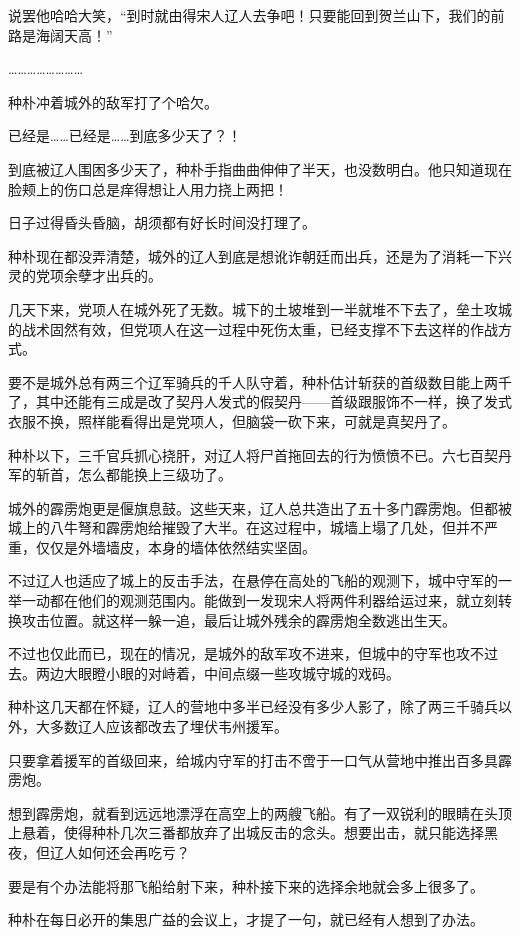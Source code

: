 说罢他哈哈大笑，“到时就由得宋人辽人去争吧！只要能回到贺兰山下，我们的前路是海阔天高！”

……………………

种朴冲着城外的敌军打了个哈欠。

已经是……已经是……到底多少天了？！

到底被辽人围困多少天了，种朴手指曲曲伸伸了半天，也没数明白。他只知道现在脸颊上的伤口总是痒得想让人用力挠上两把！

日子过得昏头昏脑，胡须都有好长时间没打理了。

种朴现在都没弄清楚，城外的辽人到底是想讹诈朝廷而出兵，还是为了消耗一下兴灵的党项余孽才出兵的。

几天下来，党项人在城外死了无数。城下的土坡堆到一半就堆不下去了，垒土攻城的战术固然有效，但党项人在这一过程中死伤太重，已经支撑不下去这样的作战方式。

要不是城外总有两三个辽军骑兵的千人队守着，种朴估计斩获的首级数目能上两千了，其中还能有三成是改了契丹人发式的假契丹——首级跟服饰不一样，换了发式衣服不换，照样能看得出是党项人，但脑袋一砍下来，可就是真契丹了。

种朴以下，三千官兵抓心挠肝，对辽人将尸首拖回去的行为愤愤不已。六七百契丹军的斩首，怎么都能换上三级功了。

城外的霹雳炮更是偃旗息鼓。这些天来，辽人总共造出了五十多门霹雳炮。但都被城上的八牛弩和霹雳炮给摧毁了大半。在这过程中，城墙上塌了几处，但并不严重，仅仅是外墙墙皮，本身的墙体依然结实坚固。

不过辽人也适应了城上的反击手法，在悬停在高处的飞船的观测下，城中守军的一举一动都在他们的观测范围内。能做到一发现宋人将两件利器给运过来，就立刻转换攻击位置。就这样一躲一追，最后让城外残余的霹雳炮全数逃出生天。

不过也仅此而已，现在的情况，是城外的敌军攻不进来，但城中的守军也攻不过去。两边大眼瞪小眼的对峙着，中间点缀一些攻城守城的戏码。

种朴这几天都在怀疑，辽人的营地中多半已经没有多少人影了，除了两三千骑兵以外，大多数辽人应该都改去了埋伏韦州援军。

只要拿着援军的首级回来，给城内守军的打击不啻于一口气从营地中推出百多具霹雳炮。

想到霹雳炮，就看到远远地漂浮在高空上的两艘飞船。有了一双锐利的眼睛在头顶上悬着，使得种朴几次三番都放弃了出城反击的念头。想要出击，就只能选择黑夜，但辽人如何还会再吃亏？

要是有个办法能将那飞船给射下来，种朴接下来的选择余地就会多上很多了。

种朴在每日必开的集思广益的会议上，才提了一句，就已经有人想到了办法。

